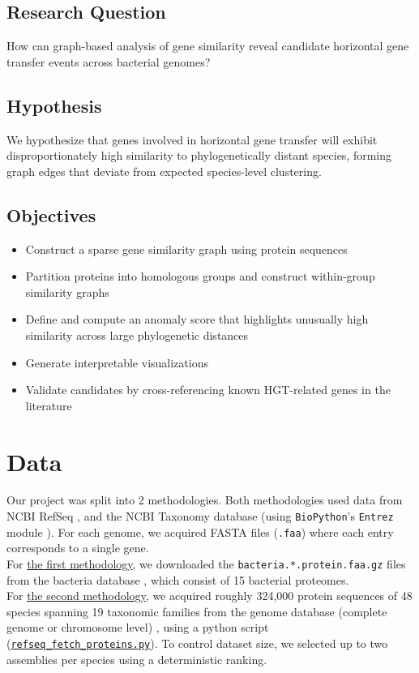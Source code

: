 \documentclass[11pt]{article}
\begin{document}
	\FloatBarrier
	
	\subsection{Research Question}
	How can graph-based analysis of gene similarity reveal candidate horizontal gene transfer events across bacterial genomes?
	
	\subsection{Hypothesis}
	We hypothesize that genes involved in horizontal gene transfer will exhibit disproportionately high similarity to phylogenetically distant species, forming graph edges that deviate from expected species-level clustering.
	
	\subsection{Objectives}
	\begin{itemize}[noitemsep, topsep=0pt]
		\item Construct a sparse gene similarity graph using protein sequences
		\item Partition proteins into homologous groups and construct within-group similarity graphs
		\item Define and compute an anomaly score that highlights unusually high similarity across large phylogenetic distances
		\item Generate interpretable visualizations
		\item Validate candidates by cross-referencing known HGT-related genes in the literature
	\end{itemize}
	
	\section{Data}
	\label{sec:data}
	Our project was split into 2 methodologies. Both methodologies used data from NCBI RefSeq \cite{RefSeq}, and the NCBI Taxonomy database \cite{NCBITaxonomy} (using \texttt{BioPython}'s \texttt{Entrez} module \cite{BioPythonEntrez}).
	For each genome, we acquired FASTA files (\texttt{.faa}) where each entry corresponds to a single gene.\\
	For \hyperref[subsec:method1]{the first methodology}, we downloaded the \texttt{bacteria.*.protein.faa.gz} files from the bacteria database \cite{RefSeqBacteria}, which consist of 15 bacterial proteomes.\\
	For \hyperref[subsec:method2]{the second methodology}, we acquired roughly 324,000 protein sequences of 48 species spanning 19 taxonomic families from the genome database (complete genome or chromosome level) \cite{RefSeqGenome}, using a python script (\href{https://github.com/noam-kimhi/Who-Stole-My-Genes/blob/main/Method\%202/src/graph_construction/refseq_fetch_proteins.py}{\uline{\texttt{refseq\_fetch\_proteins.py}}}). To control dataset size, we selected up to two assemblies per species using a deterministic ranking.
	
\end{document}
